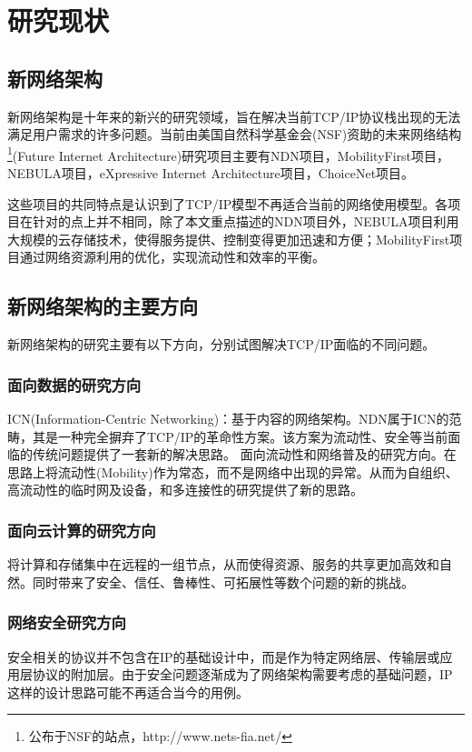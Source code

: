 \section{研究现状}

\subsection{新网络架构}
\par
新网络架构是十年来的新兴的研究领域，旨在解决当前TCP/IP协议栈出现的无法满足用户需求的许多问题。当前由美国自然科学基金会(NSF)资助的未来网络结构\footnote{公布于NSF的站点，http://www.nets-fia.net/}(Future Internet Architecture)研究项目主要有NDN项目，MobilityFirst项目，NEBULA项目，eXpressive Internet Architecture项目，ChoiceNet项目。
\par
这些项目的共同特点是认识到了TCP/IP模型不再适合当前的网络使用模型。各项目在针对的点上并不相同，除了本文重点描述的NDN项目外，NEBULA项目利用大规模的云存储技术，使得服务提供、控制变得更加迅速和方便；MobilityFirst项目通过网络资源利用的优化，实现流动性和效率的平衡。
\subsection{新网络架构的主要方向}
\setcounter{subsubsection}{0}
\par
新网络架构的研究主要有以下方向，分别试图解决TCP/IP面临的不同问题。
\subsubsection{面向数据的研究方向}
ICN(Information-Centric Networking)：基于内容的网络架构。NDN属于ICN的范畴，其是一种完全摒弃了TCP/IP的革命性方案。该方案为流动性、安全等当前面临的传统问题提供了一套新的解决思路。
面向流动性和网络普及的研究方向。在思路上将流动性(Mobility)作为常态，而不是网络中出现的异常。从而为自组织、高流动性的临时网及设备，和多连接性的研究提供了新的思路。
\subsubsection{面向云计算的研究方向}
将计算和存储集中在远程的一组节点，从而使得资源、服务的共享更加高效和自然。同时带来了安全、信任、鲁棒性、可拓展性等数个问题的新的挑战。
\subsubsection{网络安全研究方向}
安全相关的协议并不包含在IP的基础设计中，而是作为特定网络层、传输层或应用层协议的附加层。由于安全问题逐渐成为了网络架构需要考虑的基础问题，IP这样的设计思路可能不再适合当今的用例。
